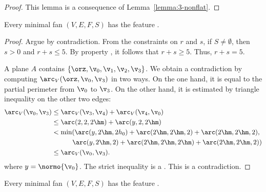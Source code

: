 \begin{proof}  
This lemma is a consequence of Lemma~\ref{lemma:3-nonflat}.
\end{proof}



\begin{lemma}[s~flat]\label{l:sf}
Every minimal fan $(V,E,F,S)$ has the feature .
\end{lemma}

\begin{proof} Argue by contradiction.  From the constraints on $r$ and
$s$, if $S\ne\emptyset$, then $s>0$ and $r+s\le 5$.
By property , it follows that $r+s\ge 5$.
Thus, $r+s=5$.  

A plane $A$ contains
$\{\orz,\v_0,\v_1,\v_2,\v_3\}$.  We obtain a contradiction
by computing $\arc_V(\orz,\v_0,\v_3)$ in two ways.  On the
one hand, it is equal to the partial perimeter from $\v_0$ to
$\v_3$.  On the other hand, it is estimated by triangle
inequality on the other two edges:
\begin{align*}
\arc_V(\v_0,\v_3)
&\le\arc_V(\v_3,\v_4) + \arc_V(\v_4,\v_0) \\
&\le\arc(2,2,2\hm)+\arc(y,2,2\hm)\\
&< \min(\arc(y,2\hm,2h_0)+\arc(2\hm,2\hm,2)+\arc(2\hm,2\hm,2) ,\\
&\phantom{<\min~}\arc(y,2\hm,2)+\arc(2\hm,2\hm,2\hm)+\arc(2\hm,2\hm,2))\\
&\le\arc_V(\v_0,\v_3).
\end{align*}
where $y=\normo{\v_0}$.  The strict inequality is a .
This is a contradiction.
\end{proof}

\begin{lemma}\label{l:ee}
Every minimal fan $(V,E,F,S)$ has the feature .
\end{lemma}

